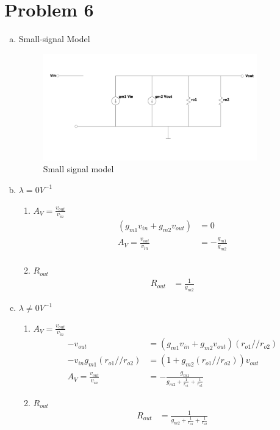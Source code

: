 \documentclass{article}
\begin{document}
\section{Problem 6}
\label{sec:org7f97a39}
\begin{enumerate}[(a)]
\item Small-signal Model
\begin{figure}[H]
\centering
\includegraphics[width=350px]{img/q6/a/small-signal-model.pdf}
\caption{\label{fig:small-signal-model}Small signal model}
\end{figure}
\item \(\lambda = 0 V^{-1}\)
\begin{enumerate}[1.]
\item \(A_{V} = \frac{v_{out}}{v_{in}}\)
\begin{equation*}
\begin{aligned}
(g_{m1}v_{in} + g_{m2} v_{out}) &= 0 \\
A_{V} = \frac{v_{out}}{v_{in}} &= -\frac{g_{m1}}{g_{m2}} \\
\end{aligned}
\end{equation*}
\item \(R_{out}\)
\begin{equation*}
\begin{aligned}
R_{out} &= \frac{1}{g_{m2}}
\end{aligned}
\end{equation*}
\end{enumerate}
\item \(\lambda \neq 0 V^{-1}\)
\begin{enumerate}[1.]
\item \(A_{V} = \frac{v_{out}}{v_{in}}\)
\begin{equation*}
\begin{aligned}
-v_{out} &= (g_{m1}v_{in} + g_{m2} v_{out})(r_{o1} // r_{o2}) \\
-v_{in} g_{m1}(r_{o1} // r_{o2}) &= (1 + g_{m2} (r_{o1} // r_{o2}))v_{out} \\
A_{V} = \frac{v_{out}}{v_{in}} &= -\frac{g_{m1}}{g_{m2} + \frac{1}{r_{o1}} + \frac{1}{r_{o2}}}
\end{aligned}
\end{equation*}

\item \(R_{out}\)
\begin{equation*}
\begin{aligned}
R_{out} &= \frac{1}{g_{m2} + \frac{1}{r_{o1}} + \frac{1}{r_{o2}}}
\end{aligned}
\end{equation*}
\end{enumerate}
\end{enumerate}
\end{document}
